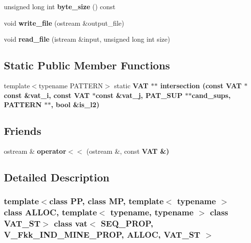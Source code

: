 \begin{CompactItemize}
\item 
unsigned long int \textbf{byte\_\-size} () const \label{classvat_3_01SEQ__PROP_00_01V__Fkk__IND__MINE__PROP_00_01ALLOC_00_01VAT__ST_01_4_f00697406b8a1e333bf2916a7d31e9f5}

\item 
void \textbf{write\_\-file} (ostream \&output\_\-file)\label{classvat_3_01SEQ__PROP_00_01V__Fkk__IND__MINE__PROP_00_01ALLOC_00_01VAT__ST_01_4_4d471eeb6b44021919f27fb2c405d840}

\item 
void \textbf{read\_\-file} (istream \&input, unsigned long int size)\label{classvat_3_01SEQ__PROP_00_01V__Fkk__IND__MINE__PROP_00_01ALLOC_00_01VAT__ST_01_4_4bdf746ffffc6df470e0f43ceb15e965}

\end{CompactItemize}
\subsection*{Static Public Member Functions}
\begin{CompactItemize}
\item 
template$<$typename PATTERN$>$ static \bf{VAT} $\ast$$\ast$ \bf{intersection} (const \bf{VAT} $\ast$const \&vat\_\-i, const \bf{VAT} $\ast$const \&vat\_\-j, \bf{PAT\_\-SUP} $\ast$$\ast$cand\_\-sups, PATTERN $\ast$$\ast$, bool \&is\_\-l2)
\end{CompactItemize}
\subsection*{Friends}
\begin{CompactItemize}
\item 
ostream \& \textbf{operator$<$$<$} (ostream \&, const \bf{VAT} \&)\label{classvat_3_01SEQ__PROP_00_01V__Fkk__IND__MINE__PROP_00_01ALLOC_00_01VAT__ST_01_4_d49d82415e012c92b69671338b69b4a4}

\end{CompactItemize}


\subsection{Detailed Description}
\subsubsection*{template$<$class PP, class MP, template$<$ typename $>$ class ALLOC, template$<$ typename, typename $>$ class VAT\_\-ST$>$ class vat$<$ SEQ\_\-PROP, V\_\-Fkk\_\-IND\_\-MINE\_\-PROP, ALLOC, VAT\_\-ST $>$}

